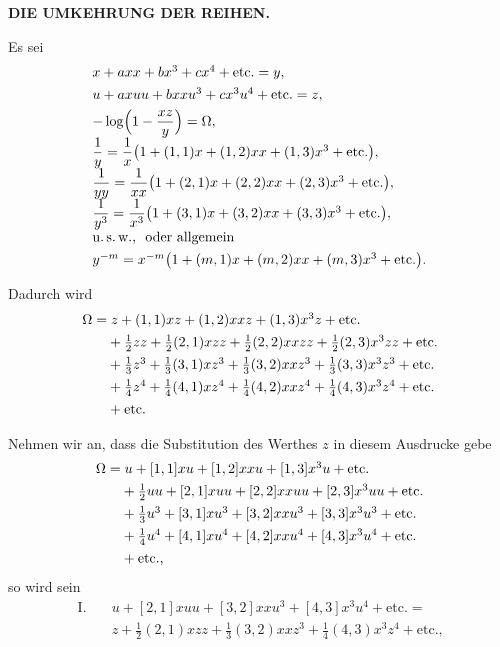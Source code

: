 \begin{center}
\textbf{DIE UMKEHRUNG DER REIHEN.}
\end{center}

\noindent\hspace*{\parindent}Es sei
\[
\begin{array}{l}
x+axx+bx^3+cx^4+\text{etc.}=y,\\[4pt]
u+axuu+bxxu^3+cx^3u^4+\text{etc.}=z,\\[4pt]
-\log\Bigl(1-\dfrac{xz}{y}\Bigr)=\Omega,\\[4pt]
\dfrac{1}{y}=\dfrac{1}{x}\bigl(1+(1,1)x+(1,2)xx+(1,3)x^3+\text{etc.}\bigr),\\[4pt]
\dfrac{1}{yy}=\dfrac{1}{xx}\bigl(1+(2,1)x+(2,2)xx+(2,3)x^3+\text{etc.}\bigr),\\[4pt]
\dfrac{1}{y^3}=\dfrac{1}{x^3}\bigl(1+(3,1)x+(3,2)xx+(3,3)x^3+\text{etc.}\bigr),\\[4pt]
\text{u.\,s.\,w.,\ \ oder allgemein}\\[4pt]
y^{-m}=x^{-m}\bigl(1+(m,1)x+(m,2)xx+(m,3)x^3+\text{etc.}\bigr).
\end{array}
\]

\noindent Dadurch wird
\[
\begin{array}{l}
\Omega=z+(1,1)xz+(1,2)xxz+(1,3)x^3z+\text{etc.}\\[4pt]
\hphantom{\Omega=}+\tfrac{1}{2}zz+\tfrac{1}{2}(2,1)xzz+\tfrac{1}{2}(2,2)xxzz+\tfrac{1}{2}(2,3)x^3zz+\text{etc.}\\[4pt]
\hphantom{\Omega=}+\tfrac{1}{3}z^3+\tfrac{1}{3}(3,1)xz^3+\tfrac{1}{3}(3,2)xxz^3+\tfrac{1}{3}(3,3)x^3z^3+\text{etc.}\\[4pt]
\hphantom{\Omega=}+\tfrac{1}{4}z^4+\tfrac{1}{4}(4,1)xz^4+\tfrac{1}{4}(4,2)xxz^4+\tfrac{1}{4}(4,3)x^3z^4+\text{etc.}\\[4pt]
\hphantom{\Omega=}+\text{etc.}
\end{array}
\]

Nehmen wir an, dass die Substitution des Werthes $z$ in diesem Ausdrucke gebe
\[
\begin{array}{l}
\Omega=u+[1,1]xu+[1,2]xxu+[1,3]x^3u+\text{etc.}\\[4pt]
\hphantom{\Omega=}+\tfrac{1}{2}uu+[2,1]xuu+[2,2]xxuu+[2,3]x^3uu+\text{etc.}\\[4pt]
\hphantom{\Omega=}+\tfrac{1}{3}u^3+[3,1]xu^3+[3,2]xxu^3+[3,3]x^3u^3+\text{etc.}\\[4pt]
\hphantom{\Omega=}+\tfrac{1}{4}u^4+[4,1]xu^4+[4,2]xxu^4+[4,3]x^3u^4+\text{etc.}\\[4pt]
\hphantom{\Omega=}+\text{etc.,}
\end{array}
\]
\noindent so wird sein
\[
\begin{aligned}\text{I.}\quad &u+[2,1]xuu+[3,2]xxu^3+[4,3]x^3u^4+\text{etc.}=\\ &z+\tfrac{1}{2}(2,1)xzz+\tfrac{1}{3}(3,2)xxz^3+\tfrac{1}{4}(4,3)x^3z^4+\text{etc.,}
\end{aligned}
\]

